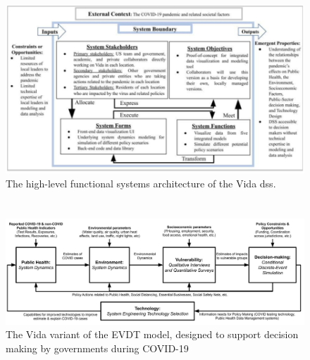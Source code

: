 \begin{figure}[H]
	\centering
	\includegraphics[scale=0.4]{Figures/chap5/architecture.png}
	\caption{The high-level functional systems architecture of the Vida \ac{dss}.}
	\label{fig:architecture}
\end{figure}

\subsubsection{}

\section{} \label{sec:vida-evdt}

\begin{figure}[H]
	\centering
	\includegraphics[scale=0.25]{Figures/chap5/Vida_Flowchart_v2.jpg}
	\caption[The Vida Variant of the EVDT Model]{The Vida variant of the EVDT model, designed to support decision making by governments during COVID-19}
	\label{fig:vida_flow}
\end{figure}

\subsection{} \label{sec:vida-evdt-method}


